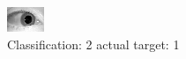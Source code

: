 \begin{figure}[h!]
\begin{center}
\includegraphics[width=0.60\columnwidth]{figures/ID1451_class_2_target_1.png}
\end{center}
\caption{ Classification: 2 actual target: 1}
\label{fig:ID1451_class_2_target_1}
\end{figure}
